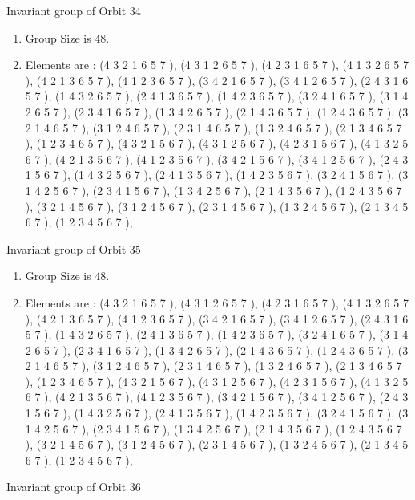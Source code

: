 \documentclass[12pt]{article}
\begin{document}
Invariant group of Orbit 34
\begin{enumerate}
\item Group Size is $48$.
\item Elements are : (4 3 2 1 6 5 7  ), (4 3 1 2 6 5 7  ), (4 2 3 1 6 5 7  ), (4 1 3 2 6 5 7  ), (4 2 1 3 6 5 7  ), (4 1 2 3 6 5 7  ), (3 4 2 1 6 5 7  ), (3 4 1 2 6 5 7  ), (2 4 3 1 6 5 7  ), (1 4 3 2 6 5 7  ), (2 4 1 3 6 5 7  ), (1 4 2 3 6 5 7  ), (3 2 4 1 6 5 7  ), (3 1 4 2 6 5 7  ), (2 3 4 1 6 5 7  ), (1 3 4 2 6 5 7  ), (2 1 4 3 6 5 7  ), (1 2 4 3 6 5 7  ), (3 2 1 4 6 5 7  ), (3 1 2 4 6 5 7  ), (2 3 1 4 6 5 7  ), (1 3 2 4 6 5 7  ), (2 1 3 4 6 5 7  ), (1 2 3 4 6 5 7  ), (4 3 2 1 5 6 7  ), (4 3 1 2 5 6 7  ), (4 2 3 1 5 6 7  ), (4 1 3 2 5 6 7  ), (4 2 1 3 5 6 7  ), (4 1 2 3 5 6 7  ), (3 4 2 1 5 6 7  ), (3 4 1 2 5 6 7  ), (2 4 3 1 5 6 7  ), (1 4 3 2 5 6 7  ), (2 4 1 3 5 6 7  ), (1 4 2 3 5 6 7  ), (3 2 4 1 5 6 7  ), (3 1 4 2 5 6 7  ), (2 3 4 1 5 6 7  ), (1 3 4 2 5 6 7  ), (2 1 4 3 5 6 7  ), (1 2 4 3 5 6 7  ), (3 2 1 4 5 6 7  ), (3 1 2 4 5 6 7  ), (2 3 1 4 5 6 7  ), (1 3 2 4 5 6 7  ), (2 1 3 4 5 6 7  ), (1 2 3 4 5 6 7  ), 
\end{enumerate}
Invariant group of Orbit 35
\begin{enumerate}
\item Group Size is $48$.
\item Elements are : (4 3 2 1 6 5 7  ), (4 3 1 2 6 5 7  ), (4 2 3 1 6 5 7  ), (4 1 3 2 6 5 7  ), (4 2 1 3 6 5 7  ), (4 1 2 3 6 5 7  ), (3 4 2 1 6 5 7  ), (3 4 1 2 6 5 7  ), (2 4 3 1 6 5 7  ), (1 4 3 2 6 5 7  ), (2 4 1 3 6 5 7  ), (1 4 2 3 6 5 7  ), (3 2 4 1 6 5 7  ), (3 1 4 2 6 5 7  ), (2 3 4 1 6 5 7  ), (1 3 4 2 6 5 7  ), (2 1 4 3 6 5 7  ), (1 2 4 3 6 5 7  ), (3 2 1 4 6 5 7  ), (3 1 2 4 6 5 7  ), (2 3 1 4 6 5 7  ), (1 3 2 4 6 5 7  ), (2 1 3 4 6 5 7  ), (1 2 3 4 6 5 7  ), (4 3 2 1 5 6 7  ), (4 3 1 2 5 6 7  ), (4 2 3 1 5 6 7  ), (4 1 3 2 5 6 7  ), (4 2 1 3 5 6 7  ), (4 1 2 3 5 6 7  ), (3 4 2 1 5 6 7  ), (3 4 1 2 5 6 7  ), (2 4 3 1 5 6 7  ), (1 4 3 2 5 6 7  ), (2 4 1 3 5 6 7  ), (1 4 2 3 5 6 7  ), (3 2 4 1 5 6 7  ), (3 1 4 2 5 6 7  ), (2 3 4 1 5 6 7  ), (1 3 4 2 5 6 7  ), (2 1 4 3 5 6 7  ), (1 2 4 3 5 6 7  ), (3 2 1 4 5 6 7  ), (3 1 2 4 5 6 7  ), (2 3 1 4 5 6 7  ), (1 3 2 4 5 6 7  ), (2 1 3 4 5 6 7  ), (1 2 3 4 5 6 7  ), 
\end{enumerate}
Invariant group of Orbit 36
\end{document}
